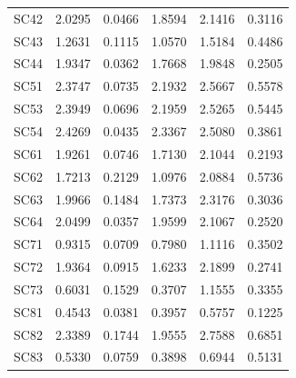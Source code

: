 \documentclass[12pt,a4paper]{article}
\begin{document}
\begin{table}[H]
\begin{tabular}{cccccc}
SC42 & 2.0295 & 0.0466 & 1.8594 & 2.1416 & 0.3116 \\
SC43 & 1.2631 & 0.1115 & 1.0570 & 1.5184 & 0.4486 \\
SC44 & 1.9347 & 0.0362 & 1.7668 & 1.9848 & 0.2505 \\
SC51 & 2.3747 & 0.0735 & 2.1932 & 2.5667 & 0.5578 \\
SC53 & 2.3949 & 0.0696 & 2.1959 & 2.5265 & 0.5445 \\
SC54 & 2.4269 & 0.0435 & 2.3367 & 2.5080 & 0.3861 \\
SC61 & 1.9261 & 0.0746 & 1.7130 & 2.1044 & 0.2193 \\
SC62 & 1.7213 & 0.2129 & 1.0976 & 2.0884 & 0.5736 \\
SC63 & 1.9966 & 0.1484 & 1.7373 & 2.3176 & 0.3036 \\
SC64 & 2.0499 & 0.0357 & 1.9599 & 2.1067 & 0.2520 \\
SC71 & 0.9315 & 0.0709 & 0.7980 & 1.1116 & 0.3502 \\
SC72 & 1.9364 & 0.0915 & 1.6233 & 2.1899 & 0.2741 \\
SC73 & 0.6031 & 0.1529 & 0.3707 & 1.1555 & 0.3355 \\
SC81 & 0.4543 & 0.0381 & 0.3957 & 0.5757 & 0.1225 \\
SC82 & 2.3389 & 0.1744 & 1.9555 & 2.7588 & 0.6851 \\
SC83 & 0.5330 & 0.0759 & 0.3898 & 0.6944 & 0.5131 \\
\bottomrule
\end{tabular}
\end{table}

\FloatBarrier
\end{document}
